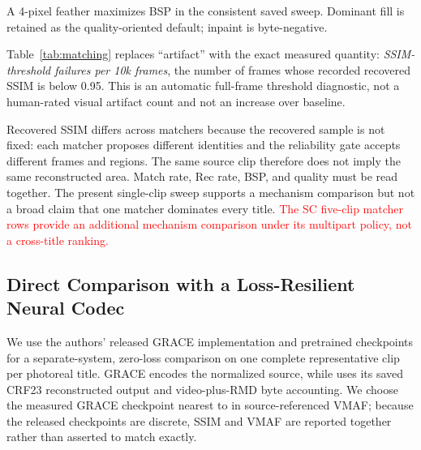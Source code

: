 A 4-pixel feather maximizes BSP in the consistent saved sweep. Dominant fill
is retained as the quality-oriented default; inpaint is byte-negative.
\begin{table}[t]
  \centering
  \small
  \caption{Feather ablation on the common no-heal intake.}
  \label{tab:feather}
  
\end{table}
\begin{table}[t]
  \centering
  \small
  \caption{Fill ablation on the same no-heal intake.}
  \label{tab:fill}
  
\end{table}

Table~\ref{tab:matching} replaces ``artifact'' with the exact measured
quantity: \emph{SSIM-threshold failures per 10k frames}, the number of frames
whose recorded recovered SSIM is below 0.95. This is an automatic
full-frame threshold diagnostic, not a human-rated visual artifact count and
not an increase over baseline.

\begin{table}[t]
  \centering
  \small
  \caption{Matcher ablation on the common no-heal intake.
  SSIM-fail/10k is explicitly the rate of frames with recovered
  $\mathrm{SSIM}<0.95$.}
  \label{tab:matching}
  
\end{table}

Recovered SSIM differs across matchers because the recovered sample is not
fixed: each matcher proposes different identities and the reliability gate
accepts different frames and regions. The same source clip therefore does not
imply the same reconstructed area. Match rate, Rec rate, BSP, and quality must
be read together. The present single-clip sweep supports a mechanism
comparison but not a broad claim that one matcher dominates every title.
\textcolor{red}{The SC five-clip matcher rows provide an additional mechanism
comparison under its multipart policy, not a cross-title ranking.}


\begingroup
\color{purple}
\subsection{Direct Comparison with a Loss-Resilient Neural Codec}
\label{sec:res-grace}

We use the authors' released GRACE implementation and pretrained checkpoints
for a separate-system, zero-loss comparison on one complete representative
clip per photoreal title. GRACE encodes the normalized source, while
\sysname uses its saved CRF23 reconstructed output and video-plus-RMD byte
accounting. We choose the measured GRACE checkpoint nearest to \sysname in
source-referenced VMAF; because the released checkpoints are discrete, SSIM
and VMAF are reported together rather than asserted to match exactly.

